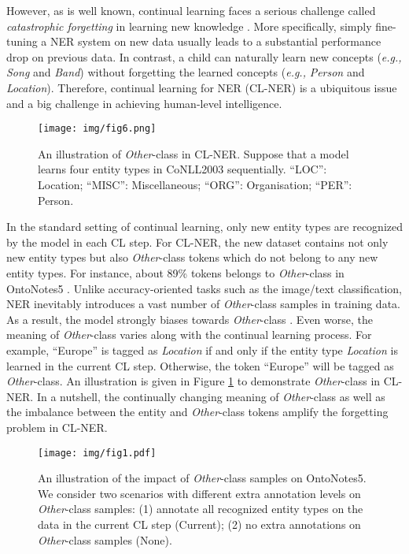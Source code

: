 \documentclass[11pt]{article}
\begin{document}
However, as is well known, continual learning faces a serious challenge called \textit{catastrophic forgetting} in learning new knowledge \citep{mccloskey1989catastrophic,robins1995catastrophic,goodfellow2013empirical,kirkpatrick2017overcoming}.
More specifically, simply fine-tuning a NER system on new data usually leads to a substantial performance drop on previous data. 
In contrast, a child can naturally learn new concepts (\textit{e.g.,} \textit{Song} and \textit{Band}) without forgetting the learned concepts (\textit{e.g.,} \textit{Person} and \textit{Location}).
Therefore, continual learning for NER (CL-NER) is a ubiquitous issue and a big challenge in achieving human-level intelligence.

\begin{figure}[t]
    \centering
    \texttt{[image: img/fig6.png]}
    \caption{An illustration of \textit{Other}-class in CL-NER. Suppose that a model learns four entity types in CoNLL2003 sequentially. ``LOC'': Location; ``MISC'': Miscellaneous; ``ORG'': Organisation; ``PER'': Person.}
    \label{fig6}
\end{figure}

In the standard setting of continual learning, only new entity types are recognized by the model in each CL step. 
For CL-NER, the new dataset contains not only new entity types but also \textit{Other}-class tokens which do not belong to any new entity types.
For instance, about 89\% tokens belongs to \textit{Other}-class in OntoNotes5 \citep{hovy2006ontonotes}.
Unlike accuracy-oriented tasks such as the image/text classification, NER inevitably introduces a vast number of \textit{Other}-class samples in training data.
As a result, the model strongly biases towards \textit{Other}-class \citep{li2020dice}.
Even worse, the meaning of \textit{Other}-class varies along with the continual learning process.
For example, ``Europe'' is tagged as \textit{Location} if and only if the entity type \textit{Location} is learned in the current CL step.
Otherwise, the token ``Europe'' will be tagged as \textit{Other}-class.
An illustration is given in Figure \ref{fig6} to demonstrate \textit{Other}-class in CL-NER.
In a nutshell, the continually changing meaning of \textit{Other}-class as well as the imbalance between the entity and \textit{Other}-class tokens amplify the forgetting problem in CL-NER.

\begin{figure}[t]
    \centering
    \texttt{[image: img/fig1.pdf]}
    \caption{An illustration of the impact of \textit{Other}-class samples on OntoNotes5. We consider two scenarios with different extra annotation levels on \textit{Other}-class samples: (1) annotate all recognized entity types on the data in the current CL step (Current); (2) no extra annotations on \textit{Other}-class samples (None).}
    \label{fig1}
\end{figure}
\end{document}
